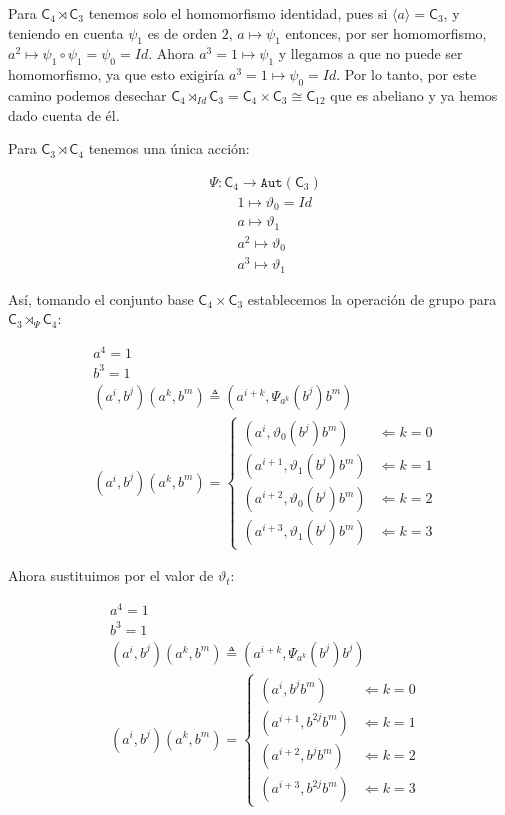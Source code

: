 \documentclass[12pt,a4paper,fleqn,spanish,final,openright]{extbook}
\theoremstyle{definition}
\theoremstyle{remark}
\begin{document}
Para $\mathsf{C}_{4}\rtimes\mathsf{C}_{3}$ tenemos solo el homomorfismo identidad, pues si 
$\langle a\rangle=\mathsf{C}_{3}$, y teniendo en cuenta $\psi_1$ es de orden 
$2$, $a \mapsto \psi_1$ entonces, por ser homomorfismo, 
$a^2 \mapsto \psi_1\circ\psi_1=\psi_0=Id$. Ahora $a^3=1 \mapsto \psi_1$ 
y llegamos a que no puede ser homomorfismo, ya que esto exigiría $a^3=1 \mapsto \psi_0 = Id$. 
Por lo tanto, por este camino podemos desechar 
$\mathsf{C}_{4}\rtimes_{Id}\mathsf{C}_{3} = 
\mathsf{C}_{4}\times\mathsf{C}_{3}\cong \mathsf{C}_{12}$ 
que es abeliano y ya hemos dado cuenta de él. 

Para $\mathsf{C}_{3}\rtimes\mathsf{C}_{4}$ tenemos una única acción:

\begin{align*}
& \Psi : \mathsf{C}_{4} \longrightarrow \texttt{Aut}\left( \mathsf{C}_{3} \right) \\
& \qquad        1				\mapsto		{\vartheta}_0 = Id \\
& \qquad		a				\mapsto		{\vartheta}_1 \\
& \qquad		a^2				\mapsto		{\vartheta}_0 \\
& \qquad		a^3				\mapsto		{\vartheta}_1
\end{align*}

Así, tomando el conjunto base $\mathsf{C}_{4}\times\mathsf{C}_{3}$ establecemos la 
operación de grupo para $\mathsf{C}_{3}\rtimes_{\Psi} \mathsf{C}_{4}$:

\begin{align*}
& a^4=1 \\
& b^3=1 \\
& (a^i,b^j)(a^k,b^m) \triangleq (a^{i+k} ,{\Psi}_{a^k}(b^j) {b^{m}}) \\
&
(a^i,b^j)(a^k,b^m) = 
	\begin{cases}
		\left( a^{i  } , \vartheta_0(b^{j}){b^m} \right)   &\Leftarrow k=0\\
		\left( a^{i+1} , \vartheta_1(b^{j}){b^m} \right)   &\Leftarrow k=1\\
		\left( a^{i+2} , \vartheta_0(b^{j}){b^m} \right)   &\Leftarrow k=2\\
		\left( a^{i+3} , \vartheta_1(b^{j}){b^m} \right)   &\Leftarrow k=3
	\end{cases} 
\end{align*}

Ahora sustituimos por el valor de $\vartheta_t$:

\begin{align*}
& a^4=1 \\
& b^3=1 \\
& (a^i,b^j)(a^k,b^m) \triangleq (a^{i+k} ,{\Psi}_{a^k}(b^j) {b^{j}}) \\
&
(a^i,b^j)(a^k,b^m) = 
	\begin{cases}
		\left( a^{i  } , {b^{j}} {b^m} \right)   &\Leftarrow k=0\\
		\left( a^{i+1} , {b^{2j}}{b^m} \right)   &\Leftarrow k=1\\
		\left( a^{i+2} , {b^{j}} {b^m} \right)   &\Leftarrow k=2\\
		\left( a^{i+3} , {b^{2j}}{b^m} \right)   &\Leftarrow k=3
	\end{cases} 
\end{align*}
\end{document}

